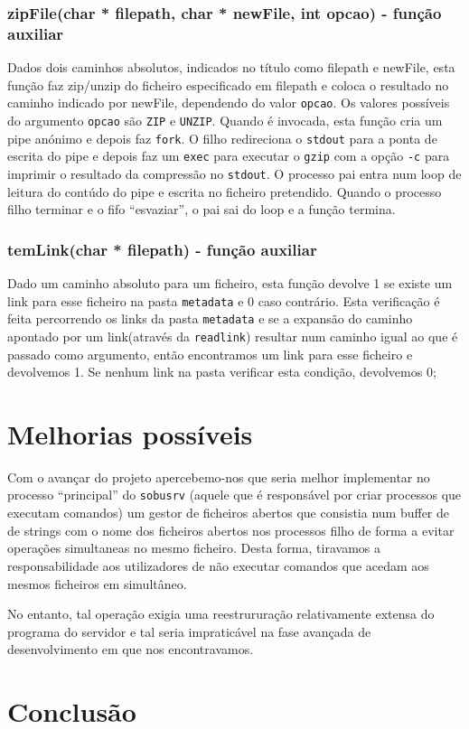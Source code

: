 \documentclass[a4paper,12pt,titlepage,draft,portuguese]{article}
\begin{document}
\subsubsection{ zipFile(char * filepath, char * newFile, int opcao) - função auxiliar}
Dados dois caminhos absolutos, indicados no título como filepath e newFile, esta função faz zip/unzip do ficheiro especificado em filepath e coloca o resultado
no caminho indicado por newFile, dependendo do valor \texttt{opcao}. Os valores possíveis do argumento \texttt{opcao} são \texttt{ZIP} e \texttt{UNZIP}.
Quando é invocada, esta função cria um pipe anónimo e depois faz \texttt{fork}. O filho redireciona o \texttt{stdout} para a ponta de escrita do pipe e depois faz
um \texttt{exec} para executar o \texttt{gzip} com a opção \texttt{-c} para imprimir o resultado da compressão no \texttt{stdout}. O processo pai entra num loop
de leitura do contúdo do pipe e escrita no ficheiro pretendido. Quando o processo filho terminar e o fifo ``esvaziar'', o pai sai do loop e a função termina.

\subsubsection{ temLink(char * filepath) - função auxiliar}
Dado um caminho absoluto para um ficheiro, esta função devolve 1 se existe um link para esse ficheiro na pasta \texttt{metadata} e 0 caso contrário.
Esta verificação é feita percorrendo os links da pasta \texttt{metadata} e se a expansão do caminho apontado por um link(através da \texttt{readlink}) 
resultar num caminho igual ao que é passado como argumento, então encontramos um link para esse ficheiro e devolvemos 1. Se nenhum link na pasta verificar 
esta condição, devolvemos 0;

\section{Melhorias possíveis}
Com o avançar do projeto apercebemo-nos que seria melhor implementar no processo ``principal'' do \texttt{sobusrv} 
(aquele que é responsável por criar processos que executam comandos) um gestor de ficheiros abertos que consistia num buffer de 
de strings com o nome dos ficheiros abertos nos processos filho de forma a evitar operações simultaneas no mesmo ficheiro. 
Desta forma, tiravamos a responsabilidade aos utilizadores de não executar comandos que acedam aos mesmos ficheiros em simultâneo.

No entanto, tal operação exigia uma reestrururação relativamente extensa do programa do servidor e tal seria impraticável na fase avançada
de desenvolvimento em que nos encontravamos.


\section{Conclusão}
\end{document}
